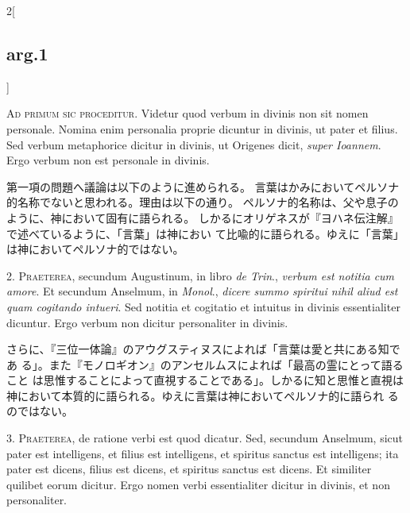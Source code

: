 \documentclass[paper=a4paper,fontsize=10pt,jafontsize=9pt,titlepage]{jlreq}
\begin{document}
{}
\setcounter{section}{1}
\setcounter{subsection}{0}

\begin{paracol}{2}[\subsection{arg.1}]

{\scshape Ad primum sic proceditur}. Videtur quod verbum in divinis non sit nomen
 personale. Nomina enim personalia proprie dicuntur in divinis, ut
 pater et filius. Sed verbum metaphorice dicitur in divinis, ut
 Origenes dicit, {\itshape super Ioannem}. Ergo verbum non est personale in
 divinis.

\switchcolumn

第一項の問題へ議論は以下のように進められる。
言葉はかみにおいてペルソナ的名称でないと思われる。理由は以下の通り。
ペルソナ的名称は、父や息子のように、神において固有に語られる。
しかるにオリゲネスが『ヨハネ伝注解』で述べているように、「言葉」は神におい
 て比喩的に語られる。ゆえに「言葉」は神においてペルソナ的ではない。


2. {\scshape Praeterea}, secundum Augustinum, in libro {\itshape de Trin}., {\itshape verbum est notitia
 cum amore}. Et secundum Anselmum, in {\itshape Monol}., {\itshape dicere summo spiritui
 nihil aliud est quam cogitando intueri}. Sed notitia et cogitatio et
 intuitus in divinis essentialiter dicuntur. Ergo verbum non dicitur
 personaliter in divinis.

\switchcolumn

さらに、『三位一体論』のアウグスティヌスによれば「言葉は愛と共にある知であ
 る」。また『モノロギオン』のアンセルムスによれば「最高の霊にとって語ること
 は思惟することによって直視することである」。しかるに知と思惟と直視は
 神において本質的に語られる。ゆえに言葉は神においてペルソナ的に語られ
 るのではない。


3. {\scshape Praeterea}, de ratione verbi est quod dicatur. Sed, secundum Anselmum,
 sicut pater est intelligens, et filius est intelligens, et spiritus
 sanctus est intelligens; ita pater est dicens, filius est dicens, et
 spiritus sanctus est dicens. Et similiter quilibet eorum
 dicitur. Ergo nomen verbi essentialiter dicitur in divinis, et non
 personaliter.


\end{paracol}
\end{document}

